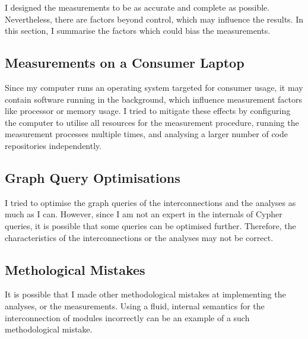 I designed the measurements to be as accurate and complete as possible. Nevertheless, there are factors beyond control, which may influence the results. In this section, I summarise the factors which could bias the measurements.


\subsection{Measurements on a Consumer Laptop}

Since my computer runs an operating system targeted for consumer usage, it may contain software running in the background, which influence measurement factors like processor or memory usage. I tried to mitigate these effects by configuring the computer to utilise all resources for the measurement procedure, running the measurement processes multiple times, and analysing a larger number of code repositories independently.


\subsection{Graph Query Optimisations}

I tried to optimise the graph queries of the interconnections and the analyses as much as I can. However, since I am not an expert in the internals of Cypher queries, it is possible that some queries can be optimised further. Therefore, the characteristics of the interconnections or the analyses may not be correct.


\subsection{Methological Mistakes}

It is possible that I made other methodological mistakes at implementing the analyses, or the measurements. Using a fluid, internal semantics for the interconnection of modules incorrectly can be an example of a such methodological mistake.